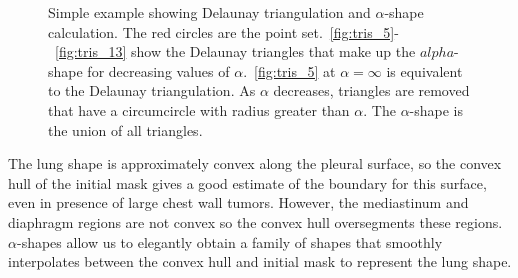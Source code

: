 \documentclass{llncs}
\begin{document}
\begin{figure}[ht!]
  \centering
  \caption{Simple example showing Delaunay triangulation and $\alpha$-shape calculation. The red circles are the point set.~\ref{fig:tris_5}-~\ref{fig:tris_13} show the Delaunay triangles that make up the $alpha$-shape for decreasing values of $\alpha$.~\ref{fig:tris_5} at $\alpha=\infty$ is equivalent to the Delaunay triangulation. As $\alpha$ decreases, triangles are removed that have a circumcircle with radius greater than $\alpha$. The $\alpha$-shape is the union of all triangles.}
  \label{fig:star}
\end{figure}

The lung shape is approximately convex along the pleural surface, so the convex hull of the initial mask gives a good estimate of the boundary for this surface, even in presence of large chest wall tumors. However, the mediastinum and diaphragm regions are not convex so the convex hull oversegments these regions. $\alpha$-shapes allow us to elegantly obtain a family of shapes that smoothly interpolates between the convex hull and initial mask to represent the lung shape. 
\end{document}
